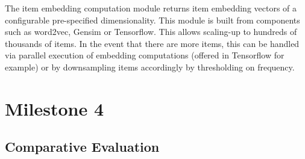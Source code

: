\documentclass{article}
\begin{document}
The item embedding computation module returns item embedding vectors of a configurable pre-specified dimensionality. This module is built from components such as word2vec, Gensim or Tensorflow. This allows scaling-up to hundreds of thousands of items. In the event that there are more items, this can be handled via parallel execution of embedding computations (offered in Tensorflow for example) or by downsampling items accordingly by thresholding on frequency. 

\section{Milestone 4}

\subsection{Comparative Evaluation}
\end{document}
